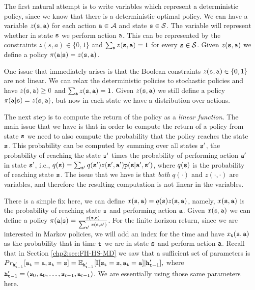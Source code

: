 The first natural attempt is to write variables which represent a deterministic policy, since we know that there is a deterministic optimal policy. We can have a variable $z({\tt s},{\tt a})$ for each action ${\tt a}\in\mathcal{A}$ and state ${\tt s}\in\mathcal{S}$. The variable will represent whether in state ${\tt s}$ we perform action ${\tt a}$. This can be represented by the constraints $z(s,a)\in\{0,1\}$ and $\sum_{{\tt a}}z({\tt s},{\tt a})=1$ for every ${\tt s} \in\mathcal{S}$. Given $z({\tt s},{\tt a})$ we define a policy $\pi({\tt a}|{\tt s})=z({\tt s},{\tt a})$.

One issue that immediately arises is that the Boolean constraints $z({\tt s},{\tt a})\in\{0,1\}$ are not linear. We can relax the deterministic policies to stochastic policies and have $z({\tt s},{\tt a})\geq 0$ and $\sum_{{\tt a}}z({\tt s},{\tt a})=1$. Given $z({\tt s},{\tt a})$ we still define a policy $\pi({\tt a}|{\tt s})=z({\tt s},{\tt a})$, but now in each state we have a distribution over actions.

The next step is to compute the return of the policy as a \textit{linear function}. The main issue that we have is that in order to compute the return of a policy from state ${\tt s}$ we need to also compute the probability that the policy reaches the state ${\tt s}$. This probability can be computed by summing over all states ${\tt s}'$, the probability of reaching the state ${\tt s}'$ times the probability of performing action ${\tt a}'$ in state ${\tt s}'$, i.e., $q({\tt s})=\sum_{{\tt s}'} q({\tt s}' )z({\tt s}',{\tt a}'){\tt p}({\tt s}|{\tt a}',{\tt s}')$, where $q({\tt s})$ is the probability of reaching state ${\tt s}$. The issue that we have is that \textit{both} $q(\cdot)$ and $z(\cdot,\cdot) $ are variables, and therefore the resulting computation is not linear in the variables.

There is a simple fix here, we can define $x({\tt s},{\tt a})=q({\tt s} )z({\tt s},{\tt a})$, namely, $x({\tt s},{\tt a})$ is the probability of reaching state ${\tt s}$ and performing action ${\tt a}$. Given $x({\tt s},{\tt a})$ we can define a policy $\pi({\tt a}|{\tt s})=\frac{x({\tt s},{\tt a})}{\sum_{{\tt a}'}x({\tt s},{\tt a}')}$. For the finite horizon return, since we are interested in Markov policies, we will add an index for the time and have $x_{\tt t}({\tt s},{\tt a})$ as the probability that in time ${\tt t}$ we are in state ${\tt s}$ and perform action ${\tt a}$.
%
Recall that in Section \ref{chp2:sec:FH-HS-MD} we saw that a sufficient set of parameters is
$Pr_{{\tt h}'_{{\tt t}-1}}
[{\tt a}_{\tt t}={\tt a},{\tt s}_{\tt t}={\tt s}]=\mathbb{E}_{{\tt h}'_{{\tt t}-1}}[\mathbb{I}
[{\tt s}_{\tt t}={\tt s},{\tt a}_{\tt t}={\tt a}]| {\tt h}'_{{\tt t}-1}],
$
where
${\tt h}'_{{\tt t}-1}=({\tt s}_0,{\tt a}_0,\ldots,{\tt s}_{t-1},{\tt a}_{t-1})$. %
We are essentially using those same parameters here.

